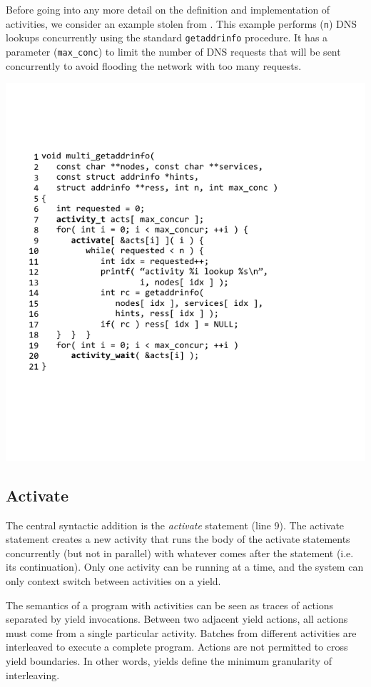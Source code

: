 \documentclass[10pt,preprint]{sigplanconf}
\begin{document}
Before going into any more detail on the definition and implementation of activities, we consider an example stolen from \cite{Krohn2007}.
This example performs (\texttt{n}) DNS lookups concurrently using the standard \texttt{getaddrinfo} procedure.
It has a parameter (\texttt{max\_conc}) to limit the number of DNS requests that will be sent concurrently to avoid flooding the network with too many requests.

\hspace{-0.5cm}
\includegraphics{multi_getaddrinfo}

\subsection{Activate}

The central syntactic addition is the \emph{activate} statement (line 9).
The activate statement creates a new activity that runs the body of the activate statements concurrently (but not in parallel) with whatever comes after the statement (i.e. its continuation).
Only one activity can be running at a time, and the system can only context switch between activities on a yield.

The semantics of a program with activities can be seen as traces of actions separated by yield invocations.
Between two adjacent yield actions, all actions must come from a single particular activity.
Batches from different activities are interleaved to execute a complete program.
Actions are not permitted to cross yield boundaries.
In other words, yields define the minimum granularity of interleaving.
\end{document}
